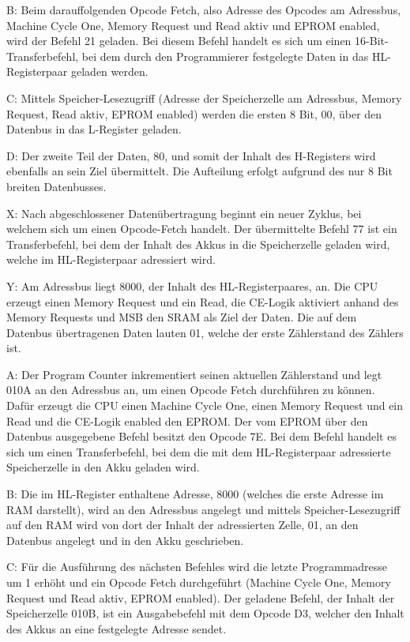 B: Beim darauffolgenden Opcode Fetch, also Adresse des Opcodes am Adressbus, Machine Cycle One, Memory Request und Read aktiv und EPROM enabled, wird der Befehl 21 geladen. Bei diesem Befehl handelt es sich um einen 16-Bit-Transferbefehl, bei dem durch den Programmierer festgelegte Daten in das HL-Registerpaar geladen werden.

C: Mittels Speicher-Lesezugriff (Adresse der Speicherzelle am Adressbus, Memory Request, Read aktiv, EPROM enabled) werden die ersten 8 Bit, 00, über den Datenbus in das L-Register geladen.

D: Der zweite Teil der Daten, 80, und somit der Inhalt des H-Registers wird ebenfalls an sein Ziel übermittelt. Die Aufteilung erfolgt aufgrund des nur 8 Bit breiten Datenbusses.

X: Nach abgeschlossener Datenübertragung beginnt ein neuer Zyklus, bei welchem sich um einen Opcode-Fetch handelt. Der übermittelte Befehl 77 ist ein Transferbefehl, bei dem der Inhalt des Akkus in die Speicherzelle geladen wird, welche im HL-Registerpaar adressiert wird.

Y: Am Adressbus liegt 8000, der Inhalt des HL-Registerpaares, an. Die CPU erzeugt einen Memory Request und ein Read, die CE-Logik aktiviert anhand des Memory Requests und MSB den SRAM als Ziel der Daten. Die auf dem Datenbus übertragenen Daten lauten 01, welche der erste Zählerstand des Zählers ist.

A: Der Program Counter inkrementiert seinen aktuellen Zählerstand und legt 010A an den Adressbus an, um einen Opcode Fetch durchführen zu können. Dafür erzeugt die CPU einen Machine Cycle One, einen Memory Request und ein Read und die CE-Logik enabled den EPROM. Der vom EPROM über den Datenbus ausgegebene Befehl besitzt den Opcode 7E. Bei dem Befehl handelt es sich um einen Transferbefehl, bei dem die mit dem HL-Registerpaar adressierte Speicherzelle in den Akku geladen wird.

B: Die im HL-Register enthaltene Adresse, 8000 (welches die erste Adresse im RAM darstellt), wird an den Adressbus angelegt und mittels Speicher-Lesezugriff auf den RAM wird von dort der Inhalt der adressierten Zelle, 01, an den Datenbus angelegt und in den Akku geschrieben.

C: Für die Ausführung des nächsten Befehles wird die letzte Programmadresse um 1 erhöht und ein Opcode Fetch durchgeführt (Machine Cycle One, Memory Request und Read aktiv, EPROM enabled). Der geladene Befehl, der Inhalt der Speicherzelle 010B, ist ein Ausgabebefehl mit dem Opcode D3, welcher den Inhalt des Akkus an eine festgelegte Adresse sendet.

